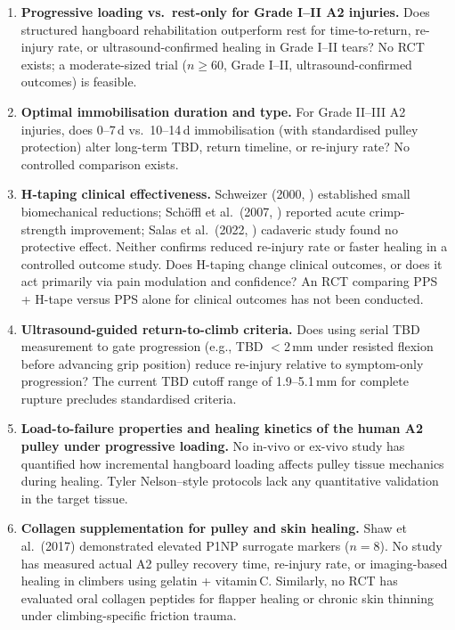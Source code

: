 \begin{enumerate}[leftmargin=2em]
  \item \textbf{Progressive loading vs.\ rest-only for Grade I--II A2 injuries.} Does structured hangboard rehabilitation outperform rest for time-to-return, re-injury rate, or ultrasound-confirmed healing in Grade I--II tears? No RCT exists; a moderate-sized trial ($n \geq 60$, Grade I--II, ultrasound-confirmed outcomes) is feasible.

  \item \textbf{Optimal immobilisation duration and type.} For Grade II--III A2 injuries, does 0--7\,d vs.\ 10--14\,d immobilisation (with standardised pulley protection) alter long-term TBD, return timeline, or re-injury rate? No controlled comparison exists.

  \item \textbf{H-taping clinical effectiveness.} Schweizer (2000, \cite{Sch00}) established small biomechanical reductions; Sch\"{o}ffl et al.\ (2007, \cite{SES+07}) reported acute crimp-strength improvement; Salas et al.\ (2022, \cite{SMT+23}) cadaveric study found no protective effect. Neither confirms reduced re-injury rate or faster healing in a controlled outcome study. Does H-taping change clinical outcomes, or does it act primarily via pain modulation and confidence? An RCT comparing PPS + H-tape versus PPS alone for clinical outcomes has not been conducted.

  \item \textbf{Ultrasound-guided return-to-climb criteria.} Does using serial TBD measurement to gate progression (e.g., TBD $<$2\,mm under resisted flexion before advancing grip position) reduce re-injury relative to symptom-only progression? The current TBD cutoff range of 1.9--5.1\,mm for complete rupture precludes standardised criteria.

  \item \textbf{Load-to-failure properties and healing kinetics of the human A2 pulley under progressive loading.} No in-vivo or ex-vivo study has quantified how incremental hangboard loading affects pulley tissue mechanics during healing. Tyler Nelson--style protocols lack any quantitative validation in the target tissue.

  \item \textbf{Collagen supplementation for pulley and skin healing.} Shaw et al.\ (2017) demonstrated elevated P1NP surrogate markers ($n=8$). No study has measured actual A2 pulley recovery time, re-injury rate, or imaging-based healing in climbers using gelatin + vitamin\,C. Similarly, no RCT has evaluated oral collagen peptides for flapper healing or chronic skin thinning under climbing-specific friction trauma.


\end{enumerate}

